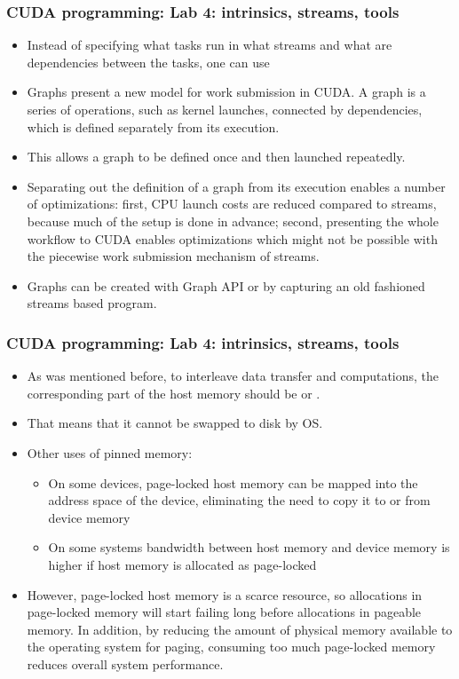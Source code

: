 \begin{frame}[fragile]
  \frametitle{CUDA programming: Lab 4: intrinsics, streams, tools}
\begin{itemize}
  \item Instead of specifying what tasks run in what streams and what are dependencies between the tasks, one can use 
  \item Graphs present a new model for work submission in CUDA. A graph is a series of
    operations, such as kernel launches, connected by dependencies, which is defined
    separately from its execution. 
  \item This allows a graph to be defined once and then launched
    repeatedly. 
  \item Separating out the definition of a graph from its execution enables a number
    of optimizations: first, CPU launch costs are reduced compared to streams, because
    much of the setup is done in advance; second, presenting the whole workflow to CUDA
    enables optimizations which might not be possible with the piecewise work submission
    mechanism of streams.
  \item Graphs can be created with Graph API or by capturing an old fashioned streams based program.
\end{itemize}
\end{frame}


\begin{frame}[fragile]
  \frametitle{CUDA programming: Lab 4: intrinsics, streams, tools}
\begin{itemize}
\item As was mentioned before, to interleave data transfer and computations, the corresponding part of the host memory should be  or .
\item That means that it cannot be swapped to disk by OS.
\item Other uses of pinned memory:
  \begin{itemize}
  \item On some devices, page-locked host memory can be mapped into the address space
    of the device, eliminating the need to copy it to or from device memory
  \item On some systems bandwidth between host memory and device
    memory is higher if host memory is allocated as page-locked
  \end{itemize}
\item However, page-locked host memory is a scarce resource, so allocations in page-locked
  memory will start failing long before allocations in pageable memory. In addition, by
  reducing the amount of physical memory available to the operating system for paging,
  consuming too much page-locked memory reduces overall system performance.
\end{itemize}
\end{frame}

